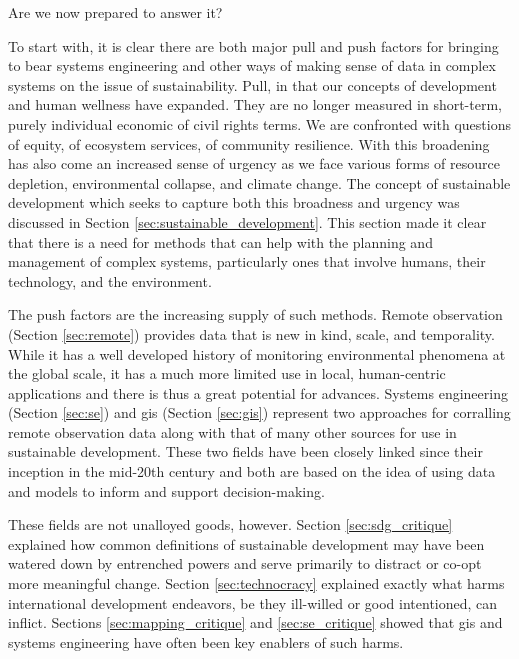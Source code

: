 Are we now prepared to answer it?

To start with, it is clear there are both major pull and push factors for bringing to bear systems engineering and other ways of making sense of data in complex systems on the issue of sustainability. Pull, in that our concepts of development and human wellness have expanded. They are no longer measured in short-term, purely individual economic of civil rights terms. We are confronted with questions of equity, of ecosystem services, of community resilience. With this broadening has also come an increased sense of urgency as we face various forms of resource depletion, environmental collapse, and climate change. The concept of sustainable development which seeks to capture both this broadness and urgency was discussed in Section \ref{sec:sustainable_development}. This section made it clear that there is a need for methods that can help with the planning and management of complex systems, particularly ones that involve humans, their technology, and the environment. 

The push factors are the increasing supply of such methods. Remote observation (Section \ref{sec:remote}) provides data that is new in kind, scale, and temporality. While it has a well developed history of monitoring environmental phenomena at the global scale, it has a much more limited use in local, human-centric applications and there is thus a great potential for advances. Systems engineering (Section \ref{sec:se}) and \ac{gis} (Section \ref{sec:gis}) represent two approaches for corralling remote observation data along with that of many other sources for use in sustainable development. These two fields have been closely linked since their inception in the mid-20th century and both are based on the idea of using data and models to inform and support decision-making.

These fields are not unalloyed goods, however. Section \ref{sec:sdg_critique} explained how common definitions of sustainable development may have been watered down by entrenched powers and serve primarily to distract or co-opt more meaningful change. Section \ref{sec:technocracy} explained exactly what harms international development endeavors, be they ill-willed or good intentioned, can inflict. Sections \ref{sec:mapping_critique} and \ref{sec:se_critique} showed that \ac{gis} and systems engineering have often been key enablers of such harms.

